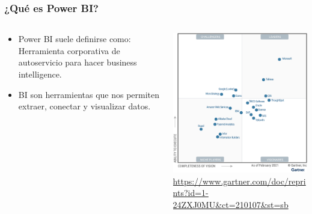 \documentclass{beamer}
\begin{document}
\begin{frame}
	\frametitle{¿Qué es Power BI?}
	\begin{columns}
		\begin{column}{0.4\textwidth}
			\begin{itemize}
				\item Power BI suele definirse como: Herramienta corporativa de autoservicio para hacer business intelligence.
				\item BI son herramientas que nos permiten extraer, conectar y visualizar datos.
			\end{itemize}

		\end{column}
		\begin{column}{0.6\textwidth}
			\centering
			\includegraphics[scale=0.4]{quadrant.png} \\
			\tiny{\url{https://www.gartner.com/doc/reprints?id=1-24ZXJ0MU&ct=210107&st=sb}}
		\end{column}
	\end{columns}
	
\end{frame}
\end{document}

